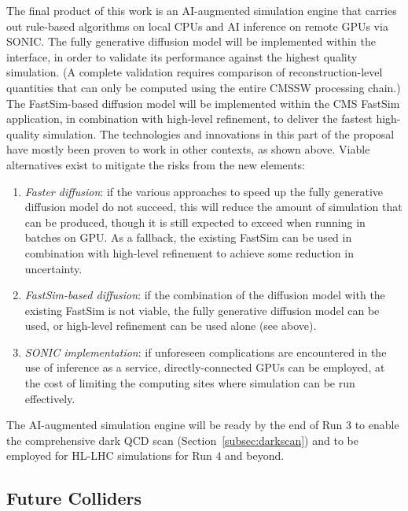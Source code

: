 The final product of this work is an AI-augmented simulation engine
that carries out rule-based algorithms on local CPUs and AI inference on remote GPUs via SONIC.
The fully generative diffusion model will be implemented within the \GEANTfour interface, in order to validate its performance against the highest quality simulation.
(A complete validation requires comparison of reconstruction-level quantities that can only be computed using the entire CMSSW processing chain.)
The FastSim-based diffusion model will be implemented within the CMS FastSim application, in combination with high-level refinement, to deliver the fastest high-quality simulation.
The technologies and innovations in this part of the proposal have mostly been proven to work in other contexts, as shown above.
Viable alternatives exist to mitigate the risks from the new elements:
\begin{enumerate}
\item \textit{Faster diffusion}: if the various approaches to speed up the fully generative diffusion model do not succeed, this will reduce the amount of simulation that can be produced, though it is still expected to exceed \GEANTfour when running in batches on GPU. As a fallback, the existing FastSim can be used in combination with high-level refinement to achieve some reduction in uncertainty.
\item \textit{FastSim-based diffusion}: if the combination of the diffusion model with the existing FastSim is not viable, the fully generative diffusion model can be used, or high-level refinement can be used alone (see above).
\item \textit{SONIC implementation}: if unforeseen complications are encountered in the use of inference as a service, directly-connected GPUs can be employed, at the cost of limiting the computing sites where simulation can be run effectively.
\end{enumerate}
The AI-augmented simulation engine will be ready by the end of Run 3 to enable the comprehensive dark QCD scan (Section~\ref{subsec:darkscan})
and to be employed for HL-LHC simulations for Run 4 and beyond.

\subsection{Future Colliders}\label{subsec:mucoll}

